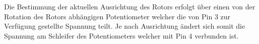 Die Bestimmung der aktuellen Ausrichtung des Rotors erfolgt über einen von der Rotation des Rotors abhängigen Potentiometer welcher die von Pin 3 zur Verfügung gestellte Spannung teilt. Je nach Ausrichtung ändert sich somit die Spannung am Schleifer des Potentiometers welcher mit Pin 4 verbunden ist.